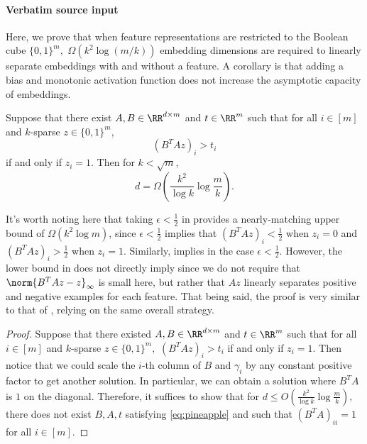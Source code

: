 \documentclass[10pt]{article}
\begin{document}
\paragraph{Verbatim source input}
\begin{ReviewVerbatim}
Here, we prove that when feature representations are restricted to the Boolean cube $\{0,1\}^m,$ $\Omega(k^2\log (m/k))$ embedding dimensions are required to linearly separate embeddings with and without a feature. A corollary is that adding a bias and monotonic activation function does not increase the asymptotic capacity of embeddings.

\begin{theorem}\label{thm:threshold}
    Suppose that there exist $A,B \in \RR^{d\times m}$ and $t\in \RR^m$ such that for all $i\in [m]$ and $k$-sparse $z\in \{0,1\}^m$,
    \begin{equation}\label{eq:pineapple}
        (B^TAz)_i > t_i
    \end{equation}
    if and only if $z_i=1.$ Then for $k < \sqrt{m}$,
    \begin{equation}
        d = \Omega\left(\frac{k^2}{\log k}\log\frac{m}{k}\right).
    \end{equation}
\end{theorem}
It's worth noting here that taking $\epsilon < \frac{1}{2}$ in  provides a nearly-matching upper bound of $\Omega(k^2\log m)$, since $\epsilon < \frac{1}{2}$ implies that $(B^TAz)_i < \frac{1}{2}$ when $z_i = 0$ and $(B^TAz)_i > \frac{1}{2}$ when $z_i = 1$. Similarly,  implies  in the case $\epsilon < \frac{1}{2}$. However, the lower bound in  does not directly imply  since we do not require that $\norm{B^TAz - z}_\infty$ is small here, but rather that $Az$ linearly separates positive and negative examples for each feature. That being said, the proof is very similar to that of , relying on the same overall strategy.

\begin{proof}
    Suppose that there existed $A,B\in \RR^{d\times m}$ and $t\in \RR^m$ such that for all $i\in [m]$ and $k$-sparse $z\in \{0,1\}^m,$ $(B^TAz)_i > t_i$ if and only if $z_i = 1.$ Then notice that we could scale the $i$-th column of $B$ and $\gamma_i$ by any constant positive factor to get another solution. In particular, we can obtain a solution where $B^TA$ is $1$ on the diagonal. Therefore, it suffices to show that for $d \le O(\frac{k^2}{\log k}\log \frac{m}{k}),$ there does not exist $B,A,t$ satisfying \eqref{eq:pineapple} and such that $(B^TA)_{ii} = 1$ for all $i\in [m].$


\end{proof}
\end{ReviewVerbatim}
\end{document}
